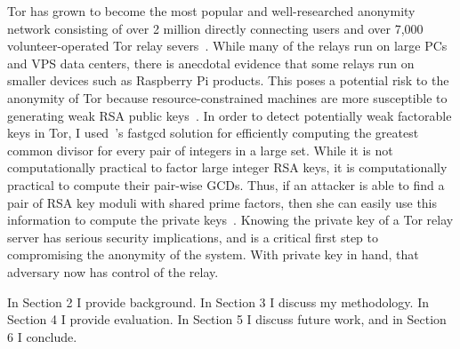 Tor has grown to become the most popular and well-researched anonymity network consisting of over 2 million directly connecting users and over 7,000 volunteer-operated Tor relay severs~\cite{metrics}. While many of the relays run on large PCs and VPS data centers, there is anecdotal evidence that some relays run on smaller devices such as Raspberry Pi products. This poses a potential risk to the anonymity of Tor because resource-constrained machines are more susceptible to generating weak RSA public keys~\cite{heninger2012mining, lenstra2012ron}. In order to detect potentially weak factorable keys in Tor, I used~\cite{heninger2012mining}'s fastgcd solution for efficiently computing the greatest common divisor for every pair of integers in a large set. While it is not computationally practical to factor large integer RSA keys, it is computationally practical to compute their pair-wise GCDs. Thus, if an attacker is able to find a pair of RSA key moduli with shared prime factors, then she can easily use this information to compute the private keys~\cite{heninger2012mining, lenstra2012ron}. Knowing the private key of a Tor relay server has serious security implications, and is a critical first step to compromising the anonymity of the system. With private key in hand, that adversary now has control of the relay.

In Section 2 I provide background. In Section 3 I discuss my methodology. In Section 4 I provide evaluation. In Section 5 I discuss future work, and in Section 6 I conclude.